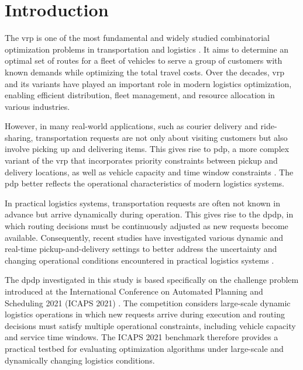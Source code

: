 \documentclass[pdflatex]{sn-jnl}
\begin{document}
\maketitle

\section{Introduction}\label{sec1}

The \gls{vrp} is one of the most fundamental and widely studied combinatorial optimization problems in transportation and logistics \cite{toth2002vehicle}. It aims to determine an optimal set of routes for a fleet of vehicles to serve a group of customers with known demands while optimizing the total travel costs. Over the decades, \gls{vrp} and its variants  have played an important role in modern logistics optimization, enabling efficient distribution, fleet management, and resource allocation in various industries. 

However, in many real-world applications, such as courier delivery and ride-sharing, transportation requests are not only about visiting customers but also involve picking up and delivering items. This gives rise to \gls{pdp}, a more complex variant of the \gls{vrp} that incorporates priority constraints between pickup and delivery locations, as well as vehicle capacity and time window constraints \cite{savelsbergh1995general}. The \gls{pdp} better reflects the operational characteristics of modern logistics systems.

In practical logistics systems, transportation requests are often not known in advance but arrive dynamically during operation. This gives rise to the \gls{dpdp}, in which routing decisions must be continuously adjusted as new requests become available. Consequently, recent studies have investigated various dynamic and real-time pickup-and-delivery settings to better address the uncertainty and changing operational conditions encountered in practical logistics systems \cite{jeong2024dynamic,wang2025multi,xiang2024centralized, zhou2024pickup}.

The \gls{dpdp} investigated in this study is based specifically on the challenge problem introduced at the International Conference on Automated Planning and Scheduling 2021 (ICAPS 2021) \cite{hao2022introduction}. The competition considers large-scale dynamic logistics operations in which new requests arrive during execution and routing decisions must satisfy multiple operational constraints, including vehicle capacity and service time windows. The ICAPS 2021 benchmark therefore provides a practical testbed for evaluating optimization algorithms under large-scale and dynamically changing logistics conditions.
\end{document}
